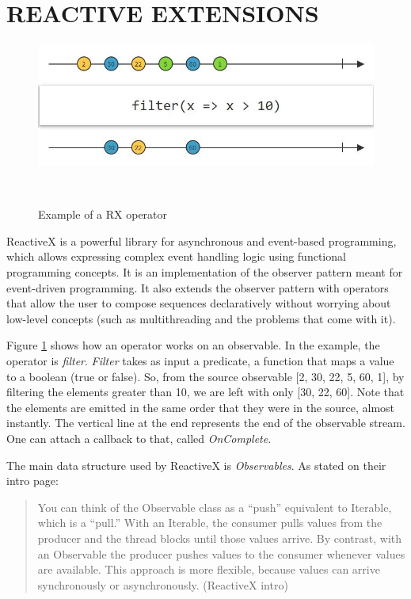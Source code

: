 \documentclass{sigchi}
\begin{document}
\section{REACTIVE EXTENSIONS}

\begin{figure}[!b]
  \centering
  \includegraphics[width=0.9\columnwidth]{figures/RX_filter}
  \caption{Example of a RX operator}~\label{fig:figure5}
\end{figure}
  
ReactiveX is a powerful library for asynchronous and event-based programming, which allows expressing complex event handling logic using functional programming concepts. It is an implementation of the observer pattern meant for event-driven programming. It also extends the observer pattern with operators that allow the user to compose sequences declaratively without worrying about low-level concepts (such as multithreading and the problems that come with it).

Figure \ref{fig:figure5} shows how an operator works on an observable. In the example, the operator is \textit{filter}. \textit{Filter} takes as input a predicate, a function that maps a value to a boolean (true or false). So, from the source observable [2, 30, 22, 5, 60, 1], by filtering the elements greater than 10, we are left with only [30, 22, 60]. Note that the elements are emitted in the same order that they were in the source, almost instantly. The vertical line at the end represents the end of the observable stream. One can attach a callback to that, called \textit{OnComplete}.


The main data structure used by ReactiveX is \textit{Observables}. As stated on their intro page:

\begin{quote}
  You can think of the Observable class as a “push” equivalent to Iterable, which is a “pull.” With an Iterable, the consumer pulls values from the producer and the thread blocks until those values arrive. By contrast, with an Observable the producer pushes values to the consumer whenever values are available. This approach is more flexible, because values can arrive synchronously or asynchronously. (ReactiveX intro)
\end{quote}
\end{document}

